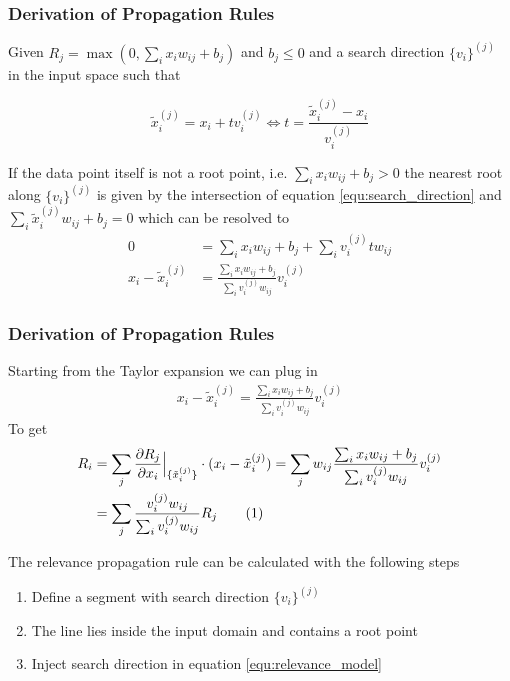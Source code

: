 \documentclass{beamer}
\newcommand\numberthis{\addtocounter{equation}{1}\tag{\theequation}}
\begin{document}
\begin{frame}
\frametitle{Derivation of Propagation Rules}
\vspace{0.3cm}
Given $R_j = \max(0, \sum_i x_i w_{ij} + b_j)$ and $b_j \leq 0$ and a search direction $\{v_i\}^{(j)}$ in the input space such that

\begin{equation}
\tilde{x}^{(j)}_i = x_i + t v_i ^{(j)} \Leftrightarrow t = \frac{\tilde{x}_i^{(j)} - x_i}{v_i^{(j)}}
\label{equ:search_direction}
\end{equation}

\vspace{0.2cm}
If the data point itself is not a root point, i.e. $\sum_i x_i w_{ij} + b_j>0$ the nearest root along $\{v_i\}^{(j)}$ is given by the intersection of equation \eqref{equ:search_direction} and $\sum_i\tilde{x}_i^{(j)} w_{ij} + b_j=0$ which can be resolved to 
\vspace{-0.1cm}
\begin{align*}
0 &= \sum_i x_i w_{ij} + b_j + \sum_i v_i^{(j)} t w_{ij} \\
x_i - \tilde{x}_i^{(j)} & = \frac{\sum_i x_i w_{ij} + b_j}{\sum_i v_i^{(j)} w_{ij}} v_i^{(j)}
\end{align*}

\end{frame}

\begin{frame}
\frametitle{Derivation of Propagation Rules}
\vspace{0.4cm}
Starting from the Taylor expansion we can plug in 
\begin{align*}
x_i - \tilde{x}_i^{(j)} = \frac{\sum_i x_i w_{ij} + b_j}{\sum_i v_i^{(j)} w_{ij}} v_i^{(j)}
\end{align*}
\vspace{-0.2cm}
To get
\vspace{-0.2cm}
\begin{align*}
R_i & = \sum_j \frac{\partial R_j}{\partial x_i}\Big|_{\{\tilde{x}_i^{(j)}\}} \cdot (x_i - \tilde{x}_i^{(j)})= \sum_j w_{ij}\frac{\sum_i x_i w_{ij} + b_j}{\sum_i v_i^{(j)} w_{ij}} v_i^{(j)}\\
&= \sum_j\frac{v_i^{(j)} w_{ij}}{\sum_i v_i^{(j)} w_{ij}} R_j \numberthis \label{equ:relevance_model}
\end{align*}

\pause
The relevance propagation rule can be calculated with the following steps
\begin{enumerate}
	\item Define a segment with search direction $\{v_i\}^{(j)}$
	\item The line lies inside the input domain and contains a root point
	\item Inject search direction in equation \eqref{equ:relevance_model}
\end{enumerate}
\end{frame}
\end{document}
